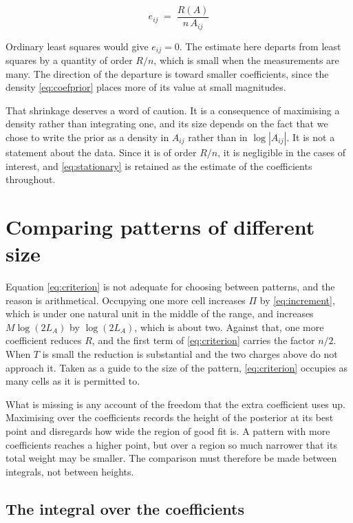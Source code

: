 \begin{equation}
e_{ij} \;=\; \frac{R(A)}{n \, A_{ij}}
\label{eq:stationary}
\end{equation}

Ordinary least squares would give $e_{ij} = 0$. The estimate here departs from least
squares by a quantity of order $R/n$, which is small when the measurements are many.
The direction of the departure is toward smaller coefficients, since the density
\eqref{eq:coefprior} places more of its value at small magnitudes.

That shrinkage deserves a word of caution. It is a consequence of maximising a
density rather than integrating one, and its size depends on the fact that we chose
to write the prior as a density in $A_{ij}$ rather than in $\log|A_{ij}|$. It is not
a statement about the data. Since it is of order $R/n$, it is negligible in the cases
of interest, and \eqref{eq:stationary} is retained as the estimate of the
coefficients throughout.

\section{Comparing patterns of different size}
\label{sec:compare}

Equation \eqref{eq:criterion} is not adequate for choosing between patterns, and the
reason is arithmetical. Occupying one more cell increases $\Pi$ by
\eqref{eq:increment}, which is under one natural unit in the middle of the range, and
increases $M \log(2 L_{A})$ by $\log (2 L_{A})$, which is about two. Against that,
one more coefficient reduces $R$, and the first term of \eqref{eq:criterion} carries
the factor $n/2$. When $T$ is small the reduction is substantial and the two charges
above do not approach it. Taken as a guide to the size of the pattern,
\eqref{eq:criterion} occupies as many cells as it is permitted to.

What is missing is any account of the freedom that the extra coefficient uses up.
Maximising over the coefficients records the height of the posterior at its best
point and disregards how wide the region of good fit is. A pattern with more
coefficients reaches a higher point, but over a region so much narrower that its
total weight may be smaller. The comparison must therefore be made between
integrals, not between heights.

\subsection{The integral over the coefficients}

